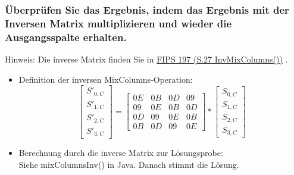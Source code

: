  \subsubsection{Überprüfen Sie das Ergebnis, indem das Ergebnis mit der Inversen Matrix multiplizieren und wieder die Ausgangsspalte erhalten.}
 Hinweis: Die inverse Matrix finden Sie in \href{http://csrc.nist.gov/publications/fips/fips197/fips-197.pdf}{FIPS 197 (S.27 InvMixColumns())} .
 \begin{itemize}
     \item Definition der inversen MixColumns-Operation:
     \begin{equation}
         \begin{bmatrix}
             S'_{0,C}\\
             S'_{1,C}\\
             S'_{2,C}\\
             S'_{3,C}
         \end{bmatrix}
         =
         \begin{bmatrix}
             0E & 0B & 0D & 09\\
             09 & 0E & 0B & 0D\\
             0D & 09 & 0E & 0B\\
             0B & 0D & 09 & 0E
         \end{bmatrix}
         *
         \begin{bmatrix}
             S_{0,C}\\
             S_{1,C}\\
             S_{2,C}\\
             S_{3,C}
         \end{bmatrix}
     \end{equation}

     \item Berechnung durch die inverse Matrix zur Lösungsprobe:\\
     Siehe mixColumnsInv() in Java. Danach stimmt die Lösung.
 \end{itemize}

